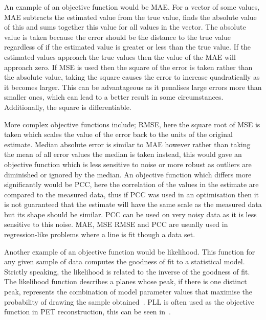                 An example of an objective function would be \gls{MAE}. For a vector of some values, \gls{MAE} subtracts the estimated value from the true value, finds the absolute value of this and sums together this value for all values in the vector. The absolute value is taken because the error should be the distance to the true value regardless of if the estimated value is greater or less than the true value. If the estimated values approach the true values then the value of the \gls{MAE} will approach zero. If \gls{MSE} is used then the square of the error is taken rather than the absolute value, taking the square causes the error to increase quadratically as it becomes larger. %
                This can be advantageous as it penalises large errors more than smaller ones, which can lead to a better result in some circumstances. Additionally, the square is differentiable.
                
                More complex objective functions include; \gls{RMSE}, here the square root of \gls{MSE} is taken which scales the value of the error back to the units of the original estimate. Median absolute error is similar to \gls{MAE} however rather than taking the mean of all error values the median is taken instead, this would gave an objective function which is less sensitive to noise or more robust as outliers are diminished or ignored by the median. An objective function which differs more significantly would be \gls{PCC}, here the correlation of the values in the estimate are compared to the measured data, thus if \gls{PCC} was used in an optimisation then it is not guaranteed that the estimate will have the same scale as the measured data but its shape should be similar. \gls{PCC} can be used on very noisy data as it is less sensitive to this noise. \gls{MAE}, \gls{MSE} \gls{RMSE} and \gls{PCC} are usually used in regression-like problems where a line is fit though a data set.
                
                Another example of an objective function would be likelihood. This function for any given sample of data computes the goodness of fit to a statistical model. Strictly speaking, the likelihood is related to the inverse of the goodness of fit. 
                The likelihood function describes a planes whose peak, if there is one distinct peak, %
                represents the combination of model parameter values that maximise the probability of drawing the sample obtained~\parencite{Myung2003TutorialEstimation}. %
                \gls{PLL} is often used as the objective function in \gls{PET} reconstruction, this can be seen in~.
                

